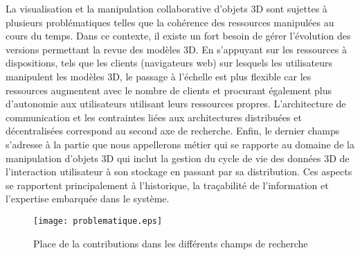 La visualisation et la manipulation collaborative d'objets \gls{3D} sont sujettes à 
plusieurs problématiques telles que la cohérence des ressources manipulées au 
cours du temps. Dans ce contexte, il existe un fort besoin de gérer l'évolution des 
versions permettant la revue des modèles \gls{3D}. 
En s'appuyant sur les ressources à dispositions, tels que les clients (navigateurs 
web) sur lesquels les utilisateurs manipulent les modèles \gls{3D}, le passage à 
l'échelle est plus flexible car les ressources augmentent avec le nombre de clients 
et procurant également plus d'autonomie aux utilisateurs utilisant leurs ressources 
propres.
L'architecture de communication et les contraintes liées aux architectures 
distribuées et décentralisées correspond au second axe de recherche. 
Enfin, le dernier champs 
s'adresse à la partie que nous appellerons \og métier\fg{} qui se rapporte au 
domaine de la manipulation d'objets 3D qui inclut la 
gestion du cycle de vie des données 3D de l'interaction utilisateur à son stockage 
en passant par sa distribution. Ces aspects se rapportent principalement à 
l'historique, la traçabilité de l'information et l'expertise embarquée dans le système.

\begin{figure}[hbt]
	\centering
	\texttt{[image: problematique.eps]}
	\caption{Place de la contributions dans les différents champs de recherche}
	\label{fig:problematique}
\end{figure}

